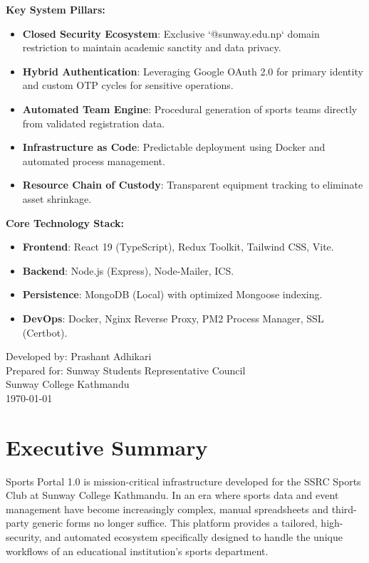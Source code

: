 \documentclass[12pt,a4paper]{article}
\begin{document}
\begin{titlepage}
\begin{flushleft}
    \textbf{Key System Pillars:}
    \begin{itemize}
        \item \textbf{Closed Security Ecosystem}: Exclusive `@sunway.edu.np` domain restriction to maintain academic sanctity and data privacy.
        \item \textbf{Hybrid Authentication}: Leveraging Google OAuth 2.0 for primary identity and custom OTP cycles for sensitive operations.
        \item \textbf{Automated Team Engine}: Procedural generation of sports teams directly from validated registration data.
        \item \textbf{Infrastructure as Code}: Predictable deployment using Docker and automated process management.
        \item \textbf{Resource Chain of Custody}: Transparent equipment tracking to eliminate asset shrinkage.
    \end{itemize}
     \textbf{Core Technology Stack:} 
    \begin{itemize}
        \item \textbf{Frontend}: React 19 (TypeScript), Redux Toolkit, Tailwind CSS, Vite.
        \item \textbf{Backend}: Node.js (Express), Node-Mailer, ICS.
        \item \textbf{Persistence}: MongoDB (Local) with optimized Mongoose indexing.
        \item \textbf{DevOps}: Docker, Nginx Reverse Proxy, PM2 Process Manager, SSL (Certbot).
    \end{itemize}
    
    \end{flushleft}
    
    \vfill
    {\normalsize Developed by: Prashant Adhikari} \\
    {\normalsize Prepared for: Sunway Students Representative Council} \\
    {\normalsize Sunway College Kathmandu} \\
    {\normalsize \today}
    
\end{titlepage}
\newpage

\tableofcontents
\newpage

\section{Executive Summary}

Sports Portal 1.0 is mission-critical infrastructure developed for the SSRC Sports Club at Sunway College Kathmandu. In an era where sports data and event management have become increasingly complex, manual spreadsheets and third-party generic forms no longer suffice. This platform provides a tailored, high-security, and automated ecosystem specifically designed to handle the unique workflows of an educational institution's sports department.
\end{document}
